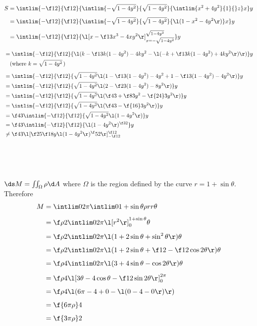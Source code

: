 \documentclass[a4paper]{article}
\begin{document}
\begin{align*}
S &= \intlim {-\f12}{\f12} {\intlim {-\sqrt{1 - 4y^2}}{\sqrt{1 - 4y^2}} {\intlim {x^2 + 4y^2}{1} {} z} x} y\\[1ex]
&= \intlim {-\f12}{\f12} {\intlim {-\sqrt{1 - 4y^2}}{\sqrt{1 - 4y^2}} {\l( 1 - x^2 - 4y^2 \r)} x} y\\[1ex]
&= \intlim {-\f12}{\f12} {\l[ x - \f13 x^3 - 4xy^2 \r]_{x = -\sqrt{1 - 4y^2}}^{\sqrt{1 - 4y^2}}} y\\[1ex]
\end{align*}
\begin{align*}
&= \intlim {-\f12}{\f12} {\l( k - \f13 k (1 - 4y^2) - 4k y^2 - \l( -k + \f13 k (1 - 4y^2) + 4k y^2 \r) \r)} y\\
&\quad \text{(where } k = \sqrt{1 - 4y^2}\, \text{)}\\[1ex]
&= \intlim {-\f12}{\f12} {\sqrt{1 - 4y^2} \l( 1 - \f13 (1 - 4y^2) - 4 y^2 + 1 - \f13 (1 - 4y^2) - 4 y^2 \r)} y\\
&= \intlim {-\f12}{\f12} {\sqrt{1 - 4y^2} \l( 2 - \f23 (1 - 4y^2) - 8 y^2 \r)} y\\
&= \intlim {-\f12}{\f12} {\sqrt{1 - 4y^2} \l( \f43 + \f83 y^2 - \f{24}3 y^2 \r)} y\\
&= \intlim {-\f12}{\f12} {\sqrt{1 - 4y^2} \l( \f43 - \f{16}3 y^2 \r)} y\\
&= \f43 \intlim {-\f12}{\f12} {\sqrt{1 - 4y^2} \l(1 - 4y^2 \r)} y\\
&= \f43 \intlim {-\f12}{\f12} {\l(1 - 4y^2 \r)^{\f32}} y\\
&\ne \f43 \l[ \f25 \f1{8y} \l(1 - 4y^2\r)^\f52 \r]_{-\f12}^{\f12}\\[1ex]
\end{align*}



\subsection{~}

$\ds M = \iint_\Omega \rho \d A$ where $\Omega$ is the region defined by the curve $r = 1 + \sin \theta$. Therefore \begin{align*}
M &= \intlim 0{2\pi} {\intlim 0 {1 + \sin \theta} {\rho r} r} \theta\\[1ex]
&= \f\rho2 \intlim 0{2\pi} {\l[ r^2 \r]_0^{1 + \sin \theta}} \theta\\[1ex]
&= \f\rho2 \intlim 0{2\pi} {\l( 1 + 2\sin\theta + \sin^2 \theta \r)} \theta\\[1ex]
&= \f\rho2 \intlim 0{2\pi} {\l( 1 + 2\sin\theta + \f12 - \f12 \cos 2\theta \r)} \theta\\[1ex]
&= \f\rho4 \intlim 0{2\pi} {\l( 3 + 4\sin\theta - \cos 2\theta \r)} \theta\\[1ex]
&= \f\rho4 \l[ 3\theta - 4\cos\theta - \f12 \sin 2\theta \r]_0^{2\pi}\\[1ex]
&= \f\rho4 \l( 6\pi - 4 + 0 - \l( 0 - 4 - 0 \r) \r)\\[1ex]
&= \f{6\pi \rho}4\\[1ex]
&= \f{3\pi \rho}2\\[1ex]
\end{align*}
\end{document}
